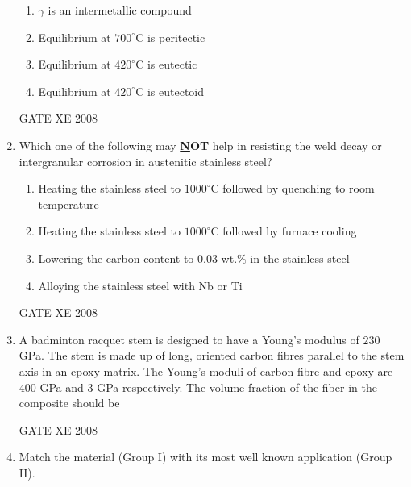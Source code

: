 \documentclass[12pt]{article}
\begin{document}
\begin{enumerate}
\begin{enumerate}
\item  $\gamma$ is an intermetallic compound  
\item  Equilibrium at $700^\circ$C is peritectic  
\item  Equilibrium at $420^\circ$C is eutectic  
\item  Equilibrium at $420^\circ$C is eutectoid  
\end{enumerate}

GATE XE 2008

\item Which one of the following may \textbf{\underline NOT} help in resisting the weld decay or intergranular corrosion in austenitic stainless steel?  

\begin{enumerate}

\item  Heating the stainless steel to $1000^\circ$C followed by quenching to room temperature  
\item  Heating the stainless steel to $1000^\circ$C followed by furnace cooling 
\item  Lowering the carbon content to $0.03$ wt.\% in the stainless steel  
\item  Alloying the stainless steel with Nb or Ti  
\end{enumerate}

GATE XE 2008

\item A badminton racquet stem is designed to have a Young’s modulus of $230$ GPa. The stem is made up of long, oriented carbon fibres parallel to the stem axis in an epoxy matrix. The Young’s moduli of carbon fibre and epoxy are $400$ GPa and $3$ GPa respectively. The volume fraction of the fiber in the composite should be  

\begin{enumerate}
\end{enumerate}

GATE XE 2008


\item Match the material (Group I) with its most well known application (Group II).


\end{enumerate}
\end{document}
